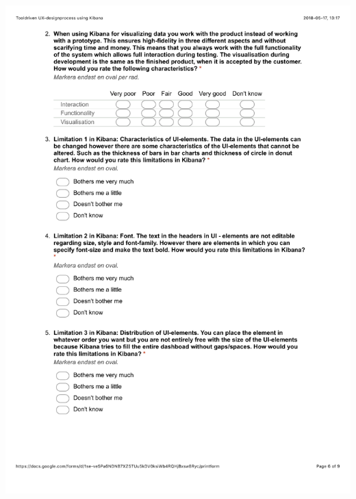 \documentclass[12pt]{kththesis}
\begin{document}
\begin{appendices}
\includegraphics[width=1\textwidth]{UX_designprocess6.pdf}
\newpage

\end{appendices}
\end{document}
